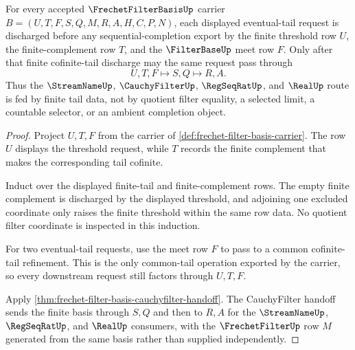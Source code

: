 \begin{theorem}
\label{thm:frechet-filter-tail-eventuality}
For every accepted $\FrechetFilterBasisUp$ carrier $B=(U,T,F,S,Q,M,R,A,H,C,P,N)$, each displayed eventual-tail request is discharged before any sequential-completion export by the finite threshold row $U$, the finite-complement row $T$, and the $\FilterBaseUp$ meet row $F$. Only after that finite cofinite-tail discharge may the same request pass through
$$
U,T,F \longmapsto S,Q \longmapsto R,A .
$$
Thus the $\StreamNameUp$, $\CauchyFilterUp$, $\RegSeqRatUp$, and $\RealUp$ route is fed by finite tail data, not by quotient filter equality, a selected limit, a countable selector, or an ambient completion object.
\end{theorem}
\begin{proof}
Project $U,T,F$ from the carrier of \autoref{def:frechet-filter-basis-carrier}. The row $U$ displays the threshold request, while $T$ records the finite complement that makes the corresponding tail cofinite.

Induct over the displayed finite-tail and finite-complement rows. The empty finite complement is discharged by the displayed threshold, and adjoining one excluded coordinate only raises the finite threshold within the same row data. No quotient filter coordinate is inspected in this induction.

For two eventual-tail requests, use the meet row $F$ to pass to a common cofinite-tail refinement. This is the only common-tail operation exported by the carrier, so every downstream request still factors through $U,T,F$.

Apply \autoref{thm:frechet-filter-basis-cauchyfilter-handoff}. The CauchyFilter handoff sends the finite basis through $S,Q$ and then to $R,A$ for the $\StreamNameUp$, $\RegSeqRatUp$, and $\RealUp$ consumers, with the $\FrechetFilterUp$ row $M$ generated from the same basis rather than supplied independently.
\end{proof}

